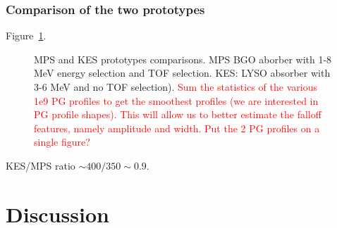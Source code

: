 \documentclass[a4paper,english]{article}
\begin{document}
\subsubsection{Comparison of the two prototypes}

Figure~\ref{PGprofileProtoComp}.

\begin{figure}[!htp]
  \centering
  \quad
  \caption{\label{PGprofileProtoComp} MPS and KES prototypes comparisons. MPS BGO aborber with 1-8 MeV energy selection and TOF selection. KES: LYSO absorber with 3-6 MeV and no TOF selection). \textcolor{red}{Sum the statistics of the various 1e9 PG profiles to get the smoothest profiles (we are interested in PG profile shapes). This will allow us to better estimate the falloff features, namely amplitude and width. Put the 2 PG profiles on a single figure?}}
\end{figure}  

KES/MPS ratio $\sim 400/350 \sim 0.9$.

\section{Discussion}


\end{document}
